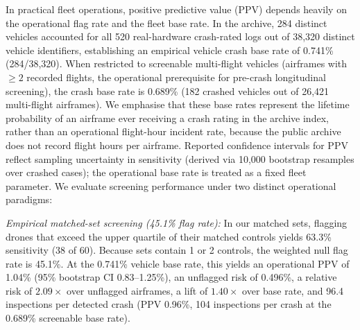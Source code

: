 \documentclass[preprint,12pt]{elsarticle}
\begin{document}
In practical fleet operations, positive predictive value (PPV) depends heavily on the operational flag rate and the fleet base rate.
In the archive, 284 distinct vehicles accounted for all 520 real-hardware crash-rated logs out of 38,320 distinct vehicle identifiers,
establishing an empirical vehicle crash base rate of 0.741\% (284/38,320). When restricted to screenable multi-flight vehicles
(airframes with $\ge 2$ recorded flights, the operational prerequisite for pre-crash longitudinal screening), the crash base rate
is 0.689\% (182 crashed vehicles out of 26,421 multi-flight airframes). We emphasise that these base rates represent the lifetime probability
of an airframe ever receiving a crash rating in the archive index, rather than an operational flight-hour incident rate, because the public
archive does not record flight hours per airframe. Reported confidence intervals for PPV reflect sampling uncertainty in sensitivity
(derived via 10,000 bootstrap resamples over crashed cases); the operational base rate is treated as a fixed fleet parameter.
We evaluate screening performance under two distinct operational paradigms:

\emph{Empirical matched-set screening (45.1\% flag rate):} In our matched sets, flagging drones that exceed the upper quartile
of their matched controls yields 63.3\% sensitivity (38 of 60). Because sets contain 1 or 2 controls, the weighted null flag rate
is 45.1\%. At the 0.741\% vehicle base rate, this yields an operational PPV of 1.04\% (95\% bootstrap CI 0.83--1.25\%), an unflagged
risk of 0.496\%, a relative risk of $2.09\times$ over unflagged airframes, a lift of $1.40\times$ over base rate, and 96.4 inspections
per detected crash (PPV 0.96\%, 104 inspections per crash at the 0.689\% screenable base rate).
\end{document}
